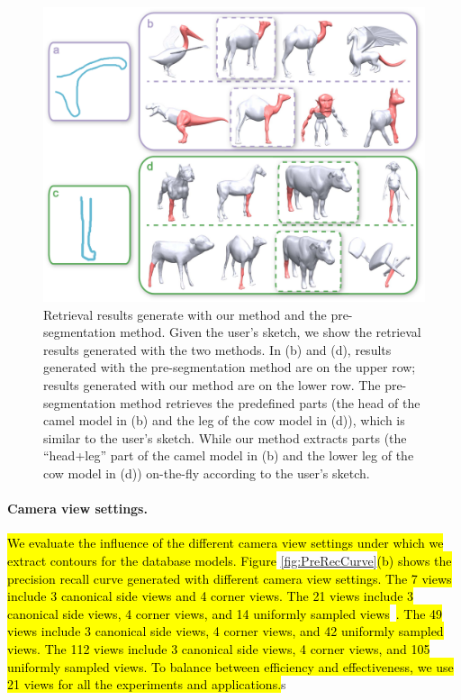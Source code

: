 \begin{figure}\centering
\includegraphics[width=1.0\linewidth]{./Material/Comp2PreSeg.pdf}
\caption{Retrieval results generate with our method and the pre-segmentation method. Given the user's sketch, we show the retrieval results generated with the two methods. In (b) and (d), results generated with the pre-segmentation method are on the upper row; results generated with our method are on the lower row. The pre-segmentation method retrieves the predefined parts (the head of the camel model in (b) and the leg of the cow model in (d)), which is similar to the user's sketch. While our method extracts parts (the ``head+leg'' part of the camel model in (b) and the lower leg of the cow model in (d)) on-the-fly according to the user's sketch.}\label{fig:Comp2PreSeg}
\end{figure}

\paragraph*{Camera view settings.} \hl{We evaluate the influence of the different camera view settings under which we extract contours for the database models. Figure }\ref{fig:PreRecCurve}\hl{(b) shows the precision recall curve generated with different camera view settings. The 7 views include 3 canonical side views and 4 corner views. The 21 views include 3 canonical side views, 4 corner views, and 14 uniformly sampled views}~\cite{FanWang2013}\hl{. The 49 views include 3 canonical side views, 4 corner views, and 42 uniformly sampled views. The 112 views include 3 canonical side views, 4 corner views, and 105 uniformly sampled views. To balance between efficiency and effectiveness, we use 21 views for all the experiments and applications.}s 